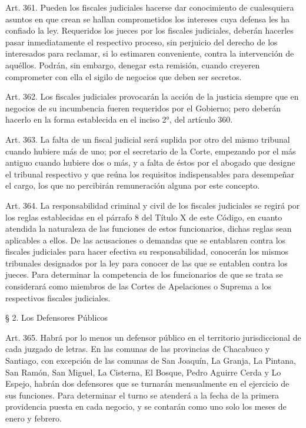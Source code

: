    Art. 361. Pueden los fiscales judiciales hacerse dar conocimiento de cualesquiera asuntos en que crean se hallan comprometidos los intereses cuya defensa les ha confiado la ley.
    Requeridos los jueces por los fiscales judiciales, deberán hacerles pasar inmediatamente el respectivo proceso, sin perjuicio del derecho de los interesados para reclamar, si lo estimaren conveniente, contra la intervención de aquéllos.
    Podrán, sin embargo, denegar esta remisión, cuando creyeren comprometer con ella el sigilo de negocios que deben ser secretos.


    Art. 362. Los fiscales judiciales provocarán la acción de la justicia siempre que en negocios de su incumbencia fueren requeridos por el Gobierno; pero deberán hacerlo en la forma establecida en el inciso 2°, del artículo 360.


    Art. 363. La falta de un fiscal judicial será suplida por otro del mismo tribunal cuando hubiere más de uno; por el secretario de la Corte, empezando por el más antiguo cuando hubiere dos o más, y a falta de éstos por el abogado que designe el tribunal respectivo y que reúna los requisitos indispensables para desempeñar el cargo, los que no percibirán remuneración alguna por este concepto.



    Art. 364. La responsabilidad criminal y civil de los fiscales judiciales se regirá por los reglas establecidas en el párrafo 8 del Título X de este Código, en cuanto atendida la naturaleza de las funciones de estos funcionarios, dichas reglas sean aplicables a ellos.
    De las acusaciones o demandas que se entablaren contra los fiscales judiciales para hacer efectiva su responsabilidad, conocerán los mismos tribunales designados por la ley para conocer de las que se entablen contra los jueces.
    Para determinar la competencia de los funcionarios de que se trata se considerará como miembros de las Cortes de Apelaciones o Suprema a los respectivos fiscales judiciales.


    § 2. Los Defensores Públicos


    Art. 365. Habrá por lo menos un defensor público en el territorio jurisdiccional de cada juzgado de letras.
    En las comunas de las provincias de Chacabuco y Santiago, con excepción de las comunas de San Joaquín, La Granja, La Pintana, San Ramón, San Miguel, La Cisterna, El Bosque, Pedro Aguirre Cerda y Lo Espejo, habrán dos defensores que se turnarán mensualmente en el ejercicio de sus funciones. Para determinar el turno se atenderá a la fecha de la primera providencia puesta en cada negocio, y se contarán como uno solo los meses de enero y febrero.



